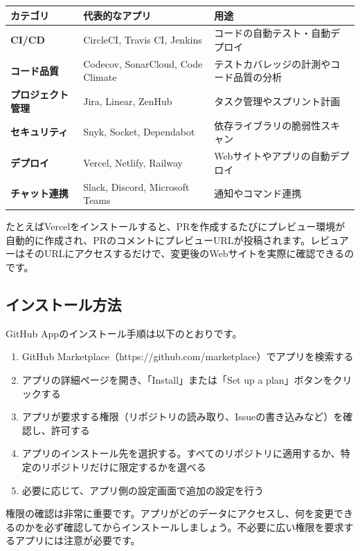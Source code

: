\begin{table}[h]
\centering
\begin{tabular}{lll}
\hline
カテゴリ & 代表的なアプリ & 用途 \\
\hline
\textbf{CI/CD} & CircleCI, Travis CI, Jenkins & コードの自動テスト・自動デプロイ \\
\textbf{コード品質} & Codecov, SonarCloud, Code Climate & テストカバレッジの計測やコード品質の分析 \\
\textbf{プロジェクト管理} & Jira, Linear, ZenHub & タスク管理やスプリント計画 \\
\textbf{セキュリティ} & Snyk, Socket, Dependabot & 依存ライブラリの脆弱性スキャン \\
\textbf{デプロイ} & Vercel, Netlify, Railway & Webサイトやアプリの自動デプロイ \\
\textbf{チャット連携} & Slack, Discord, Microsoft Teams & 通知やコマンド連携 \\
\hline
\end{tabular}
\end{table}

たとえばVercelをインストールすると、PRを作成するたびにプレビュー環境が自動的に作成され、PRのコメントにプレビューURLが投稿されます。レビュアーはそのURLにアクセスするだけで、変更後のWebサイトを実際に確認できるのです。

\subsection{インストール方法}

GitHub Appのインストール手順は以下のとおりです。

\begin{enumerate}
  \item GitHub Marketplace（https://github.com/marketplace）でアプリを検索する
  \item アプリの詳細ページを開き、「Install」または「Set up a plan」ボタンをクリックする
  \item アプリが要求する権限（リポジトリの読み取り、Issueの書き込みなど）を確認し、許可する
  \item アプリのインストール先を選択する。すべてのリポジトリに適用するか、特定のリポジトリだけに限定するかを選べる
  \item 必要に応じて、アプリ側の設定画面で追加の設定を行う
\end{enumerate}

権限の確認は非常に重要です。アプリがどのデータにアクセスし、何を変更できるのかを必ず確認してからインストールしましょう。不必要に広い権限を要求するアプリには注意が必要です。

